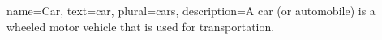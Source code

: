 {
    name={Car},
    text={car},
    plural={cars},
    description={A car (or automobile) is a wheeled motor vehicle that is used for transportation.}
}
